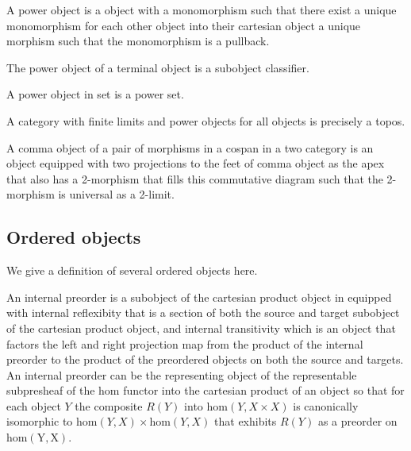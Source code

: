 \begin{definition}
    \label{definition-power-object}
    A power object is a object with a monomorphism such that there exist a unique monomorphism for each other object into their cartesian object a unique morphism such that the monomorphism is a pullback.
\end{definition}

\begin{definition}
    \label{definition-subobject-classifier}
    The power object of a terminal object is a subobject classifier.
\end{definition}

\begin{example}
    A power object in set is a power set.

    A category with finite limits and power objects for all objects is precisely a topos.
\end{example}

\begin{definition}
    \label{definition-comma-object}
    A comma object of a pair of morphisms in a cospan in a two category is an object equipped with two projections to the feet of comma object as the apex that also has a 2-morphism that fills this commutative diagram such that the 2-morphism is universal as a 2-limit.
\end{definition}

\subsection{Ordered objects}

We give a definition of several ordered objects here.

\begin{definition}
    \label{definition-internal-preorder}
    An internal preorder is a subobject of the cartesian product object in equipped with internal reflexibity that is a section of both the source and target subobject of the cartesian product object, and internal transitivity which is an object that factors the left and right projection map from the product of the internal preorder to the product of the preordered objects on both the source and targets. An internal preorder can be the representing object of the representable subpresheaf of the hom functor into the cartesian product of an object so that for each object $Y$ the composite $R(Y)$ into $\mathrm{hom}(Y, X \times X)$ is canonically isomorphic to $\mathrm{hom}(Y,X) \times \mathrm{hom}(Y,X)$ that exhibits $R(Y)$ as a preorder on $\mathrm{hom(Y,X)}$.
\end{definition}

